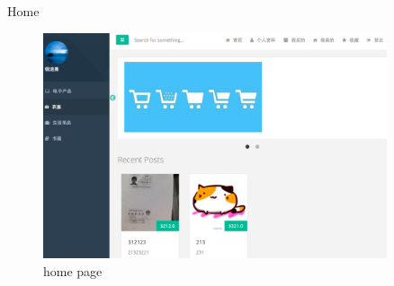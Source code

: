 \documentclass[final]{beamer}
\newlength{\sepwid}
\newlength{\onecolwid}
\newlength{\twocolwid}
\begin{document}
\begin{frame}[t]
\begin{columns}[t]
\begin{column}{\onecolwid}
\begin{block}{Home}

        \end{block}

        \begin{figure}
        \includegraphics[width=1\linewidth]{home.png}
        \caption{home page}
        \end{figure}





    \end{column} %

    \begin{column}{\sepwid}\end{column} %

    \begin{column}{\onecolwid} %




\end{column}
\end{columns}
\end{frame}
\end{document}
